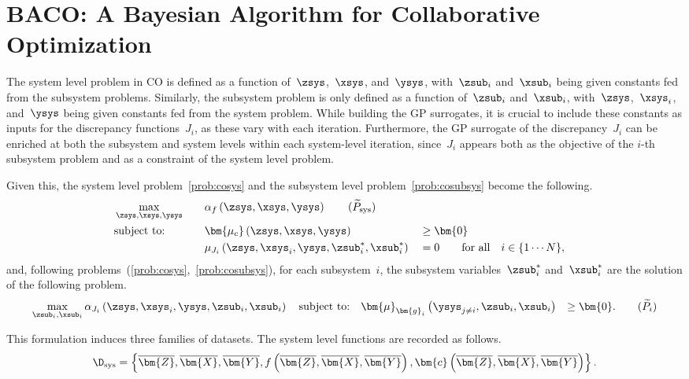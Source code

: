 \section{BACO: A Bayesian Algorithm for Collaborative Optimization}\label{sec:baco}

The system level problem in CO is defined as a function of~\(\zsys\),~\(\xsys\), and~\(\ysys\), with~\(\zsub_i\) and~\(\xsub_i\) being given constants fed from the subsystem problems. Similarly, the subsystem problem is only defined as a function of~\(\zsub_i\) and~\(\xsub_i\), with~\(\zsys\),~\(\xsys_i\), and~\(\ysys\) being given constants fed from the system problem. While building the GP surrogates, it is crucial to include these constants as inputs for the discrepancy functions~\(J_i\), as these vary with each iteration. Furthermore, the GP surrogate of the discrepancy~\(J_i\) can be enriched at both the subsystem and system levels within each system-level iteration, since~\(J_i\) appears both as the objective of the \(i\)-th subsystem problem and as a constraint of the system level problem.

Given this, the system level problem~\eqref{prob:cosys} and the subsystem level problem~\eqref{prob:cosubsys} become the following.
\begin{alignat}{5}
  &\max_{
    \zsys,
    \xsys,
    \ysys
  }\quad && \alpha_f\left(
    \zsys,
    \xsys,
    \ysys
  \right)
  \tag{\(\widetilde{P}_\text{sys}\)}\label{prob:bacosys}\\
  &\text{subject to:}\quad
  &&\bm{\mu_c}\left(
    \zsys,
    \xsys,
    \ysys
  \right) && \geq \bm{0} \nonumber\\
  &   &&\mu_{J_i}\left(
    \zsys,
    \xsys_i,
    \ysys,
    \zsub_i^*,
    \xsub_i^*
  \right) &&= 0\qquad \text{for all}\quad i\in\{1\cdots N\},\nonumber
\end{alignat}
and, following problems~(\ref{prob:cosys},~\ref{prob:cosubsys}), for each subsystem~\(i\), the subsystem variables~\(\zsub_i^*\) and~\(\xsub_i^*\) are the solution of the following problem.
\begin{alignat}{5}
  \max_{\zsub_i, \xsub_i}
  \alpha_{J_i}\left(
    \zsys,
    \xsys_i,
    \ysys,
    \zsub_i,
    \xsub_i
  \right)
  \quad\text{subject to:}\quad
  \bm{\mu}_{\bm{g}_i}\left(
    \ysys_{j\neq i},
    \zsub_i,
    \xsub_i
  \right) &&\geq\bm{0}.\tag{\(\widetilde{P}_i\)}\label{prob:bacosubsys}
\end{alignat}

This formulation induces three families of datasets. The system level functions are recorded as follows.
\begin{equation*}
  \D_\text{sys} = \left\{
    \overline{\bm{Z}},
    \overline{\bm{X}},
    \overline{\bm{Y}},
    f\left(
      \overline{\bm{Z}},
      \overline{\bm{X}},
      \overline{\bm{Y}}
    \right),
    \bm{c}\left(
      \overline{\bm{Z}},
      \overline{\bm{X}},
      \overline{\bm{Y}}
    \right)
  \right\}.
\end{equation*}

